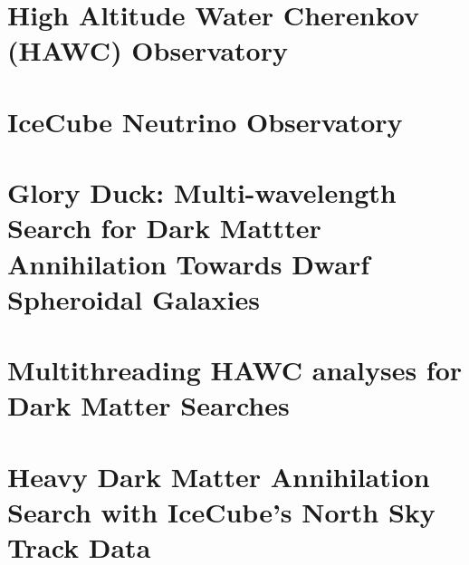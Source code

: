 \documentclass[PhD]{msu-thesis}
\begin{document}
% 

\chapter{High Altitude Water Cherenkov (HAWC) Observatory\label{sec:hawc}}


\chapter{IceCube Neutrino Observatory\label{sec:ice3}}


\chapter{Glory Duck: Multi-wavelength Search for Dark Mattter Annihilation Towards Dwarf Spheroidal Galaxies}\label{sec:glory_duck}


\chapter{Multithreading HAWC analyses for Dark Matter Searches} \label{sec:multithread}


\chapter{Heavy Dark Matter Annihilation Search with IceCube's North Sky Track Data} \label{sec:ic3_dm}

\end{document}
